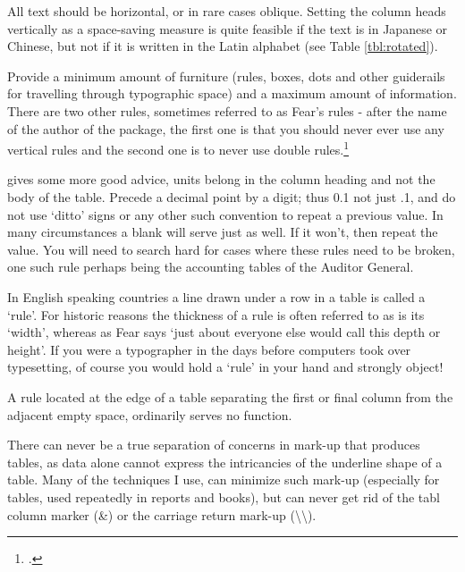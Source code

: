 All text should be horizontal, or in rare cases oblique. Setting the column heads vertically 
as a space-saving measure is quite feasible if the text is in Japanese or Chinese, 
but not if it is written in the Latin alphabet (see Table \ref{tbl:rotated}).

\begin{figure}[htbp]
\bgroup
\parindent=0pt
\hfill{}
\egroup
\end{figure}

Provide a minimum amount of furniture (rules, boxes, dots and other guiderails for travelling through typographic space) and a maximum amount of information. There are two other rules, sometimes referred to as Fear's rules - after the name of the author of the  package, the first one is that you should never ever use any vertical rules and the second one is to never use double rules.\footcite{booktabs}


\citeauthor{booktabs} gives some more good advice,   units belong in the column heading and not the body of the table. Precede a decimal point by a digit; thus 0.1 not just .1, and do not use `ditto' signs or any other such convention to repeat a previous value. In many circumstances a blank will serve just as well. If it won't,
then repeat the value. You will need to search hard for cases where these rules need to be broken, one such rule perhaps being the accounting tables of the Auditor General. 

In English speaking countries a line drawn under a row in a table is called a `rule'. For historic reasons the thickness of a rule is often referred to as is its `width', whereas as Fear says `just about everyone else would call this depth or height'.
If you were a typographer in the days before computers took over typesetting, of course you would hold a `rule' in your hand and strongly object!

A rule located at the edge of a table separating the first or final column from the adjacent empty space, ordinarily serves no function.

There can never be a true separation of concerns in mark-up that produces tables, as data alone cannot express the intricancies of the underline shape of a table. Many of the techniques I use, can minimize such mark-up (especially for tables, used repeatedly in reports and books), but can never get rid of the tabl column marker (\&) or the carriage return mark-up (\textbackslash\textbackslash).


